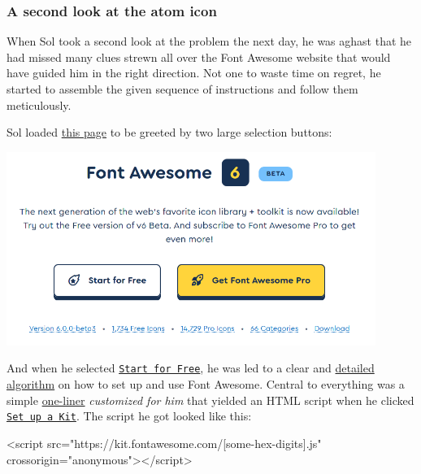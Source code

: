 \documentclass[
  british,
  a4paper,
  rgb,
  dvipsnames,
  svgnames,
  hyphens]{article}
\newenvironment{Shaded}{\begin{snugshade}}{\end{snugshade}}
\newcommand{\ErrorTok}[1]{\textcolor[rgb]{0.76,0.75,0.62}{#1}}
\newcommand{\KeywordTok}[1]{\textcolor[rgb]{0.94,0.87,0.69}{#1}}
\newcommand{\OtherTok}[1]{\textcolor[rgb]{0.94,0.94,0.56}{#1}}
\newcommand{\StringTok}[1]{\textcolor[rgb]{0.80,0.58,0.58}{#1}}
\begin{document}
\hypertarget{a-second-look-at-the-atom-icon}{%
\subsubsection{A second look at the atom
icon}\label{a-second-look-at-the-atom-icon}}

When Sol took a second look at the problem the next day, he was aghast
that he had missed many clues strewn all over the Font Awesome website
that would have guided him in the right direction. Not one to waste time
on regret, he started to assemble the given sequence of instructions and
follow them meticulously.

Sol loaded \href{https://fontawesome.com/v6.0}{this page} to be greeted
by two large selection buttons:

\includegraphics[width=0.9\textwidth,height=\textheight]{images/start-for-free.png}

And when he selected
\href{https://fontawesome.com/v6.0/docs/web/setup/quick-start}{\texttt{Start\ for\ Free}},
he was led to a clear and
\href{https://fontawesome.com/v6.0/docs/web/setup/quick-start}{detailed
algorithm} on how to set up and use Font Awesome. Central to everything
was a simple
\href{https://en.wikipedia.org/wiki/One-liner_program}{one-liner}
\emph{customized for him} that yielded an HTML script when he clicked
\href{https://fontawesome.com/kits}{\texttt{Set\ up\ a\ Kit}}. The
script he got looked like this:

\begin{Shaded}
\begin{Highlighting}[]
\KeywordTok{\textless{}script} \ErrorTok{src}\OtherTok{=}\StringTok{"https://kit.fontawesome.com/[some{-}hex{-}digits].js"}
\OtherTok{    crossorigin=}\StringTok{"anonymous"}\KeywordTok{\textgreater{}\textless{}/script\textgreater{}}
\end{Highlighting}
\end{Shaded}
\end{document}
